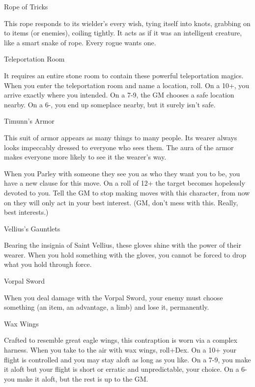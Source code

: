        

Rope of Tricks	 

       

This rope responds to its wielder’s every wish, tying itself into knots, grabbing on to items (or enemies), coiling tightly. It acts as if it was an intelligent creature, like a smart snake of rope. Every rogue wants one.

       

Teleportation Room	 

       

It requires an entire stone room to contain these powerful teleportation magics. When you enter the teleportation room and name a location, roll. On a 10+, you arrive exactly where you intended. On a 7-9, the GM chooses a safe location nearby. On a 6-, you end up someplace nearby, but it surely isn't safe.

       

Timunn's Armor	 

       

This suit of armor appears as many things to many people. Its wearer always looks impeccably dressed to everyone who sees them. The aura of the armor makes everyone more likely to see it the wearer's way.

       

When you Parley with someone they see you as who they want you to be, you have a new clause for this move. On a roll of 12+ the target becomes hopelessly devoted to you. Tell the GM to stop making moves with this character, from now on they will only act in your best interest. (GM, don’t mess with this. Really, best interests.)

       

Vellius’s Gauntlets	 

       

Bearing the insignia of Saint Vellius, these gloves shine with the power of their wearer. When you hold something with the gloves, you cannot be forced to drop what you hold through force.

       

Vorpal Sword	 

       

When you deal damage with the Vorpal Sword, your enemy must choose something (an item, an advantage, a limb) and lose it, permanently.

       

Wax Wings	 

       

Crafted to resemble great eagle wings, this contraption is worn via a complex harness. When you take to the air with wax wings, roll+Dex. On a 10+ your flight is controlled and you may stay aloft as long as you like. On a 7-9, you make it aloft but your flight is short or erratic and unpredictable, your choice. On a 6- you make it aloft, but the rest is up to the GM.

                
